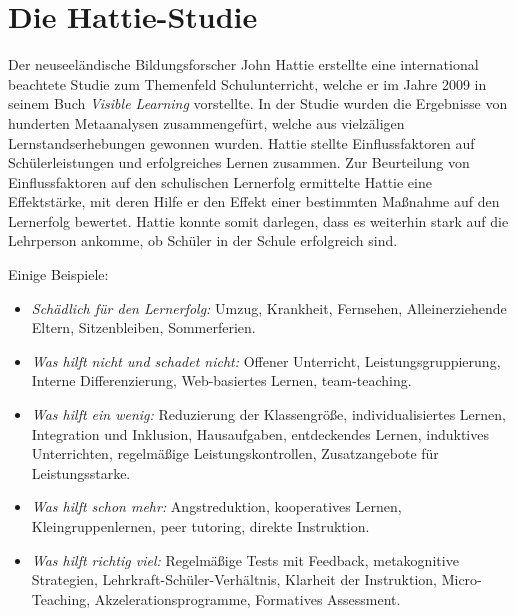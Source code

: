 \bip\bip
\section{Die Hattie-Studie}
Der neuseel{\"a}ndische Bildungsforscher John Hattie erstellte eine international beachtete Studie zum Themenfeld {\glqq}Schulunterricht{\grqq}, 
welche er im Jahre 2009 in seinem Buch \emph{Visible Learning} vorstellte. In der Studie wurden die Ergebnisse von hunderten Metaanalysen zusammengef{\"u}rt,
welche aus vielz{\"a}ligen Lernstandserhebungen gewonnen wurden. Hattie stellte Einflussfaktoren auf Sch{\"u}lerleistungen und erfolgreiches Lernen zusammen. 
\mip
Zur Beurteilung von Einflussfaktoren auf den schulischen Lernerfolg ermittelte Hattie eine Effektst{\"a}rke, mit deren Hilfe er den Effekt einer 
bestimmten Ma{\ss}nahme auf den Lernerfolg bewertet. Hattie konnte somit darlegen, dass es weiterhin stark auf die Lehrperson ankomme, 
ob Sch{\"u}ler in der Schule erfolgreich sind.
\mip

Einige Beispiele:
\begin{itemize}
\item
{\emph{Sch{\"a}dlich f{\"u}r den Lernerfolg:}} Umzug, Krankheit, Fernsehen, Alleinerziehende Eltern, Sitzenbleiben, Sommerferien.
\item
{\emph{Was hilft nicht und schadet nicht:}} Offener Unterricht, Leistungsgruppierung, Interne Differenzierung, Web-basiertes Lernen, team-teaching.
\item
{\emph{Was hilft ein wenig:}} Reduzierung der Klassengr{\"o}{\ss}e, individualisiertes Lernen, Integration und Inklusion, Hausaufgaben, entdeckendes Lernen, induktives Unterrichten, regelm{\"a}{\ss}ige Leistungskontrollen, Zusatzangebote f{\"u}r Leistungsstarke.
\item
{\emph{Was hilft schon mehr:}} Angstreduktion, kooperatives Lernen, Kleingruppenlernen, peer tutoring, direkte Instruktion.
\item
{\emph{Was hilft richtig viel:}} Regelm{\"a}{\ss}ige Tests mit Feedback, metakognitive Strategien, Lehrkraft-Sch{\"u}ler-Verh{\"a}ltnis, Klarheit der Instruktion, Micro-Teaching, Akzelerationsprogramme, Formatives Assessment. 
\end{itemize}



